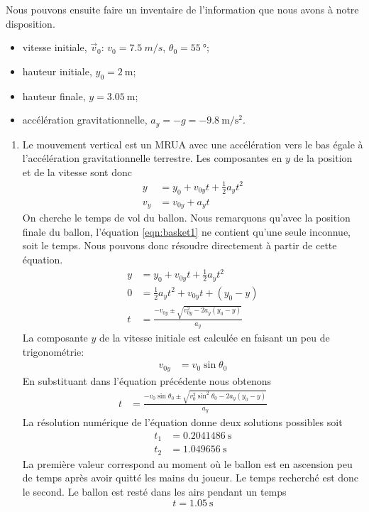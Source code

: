 \documentclass{tufte-handout}
\begin{document}
Nous pouvons ensuite faire un inventaire de l'information que nous avons à
notre disposition.

\begin{itemize}
  \item vitesse initiale, $\vec{v}_0$: $v_0 = \SI{7.5}{m/s}$,
    $\theta_0 = \SI{55}{\degree}$;
  \item hauteur initiale, $y_0 = \SI{2}{\meter}$;
  \item hauteur finale, $y = \SI{3.05}{\meter}$;
  \item accélération gravitationnelle, $a_y =
    -g = \SI{-9.8}{\meter\per\second\squared}$.
\end{itemize}

\begin{enumerate}
  \item
    Le mouvement vertical est un MRUA avec une accélération vers le bas égale à
    l'accélération gravitationnelle terrestre.  Les composantes en $y$ de la
    position et de la vitesse sont donc
    \begin{align}
      y   &= y_0 + v_{0y}t + \frac{1}{2} a_y t^2 \label{eqn:basket1}\\
      v_y &= v_{0y} + a_y t \label{eqn:basket2}
    \end{align}
    On cherche le temps de vol du ballon.  Nous remarquons qu'avec la position
    finale du ballon, l'équation \ref{eqn:basket1} ne contient qu'une seule
    inconnue, soit le temps.  Nous pouvons donc résoudre directement à partir
    de cette équation.
    \begin{align*}
      y &= y_0 + v_{0y} t + \frac{1}{2} a_y t^2 \\
      0 &= \frac{1}{2} a_y t^2 + v_{0y} t + (y_0 - y) \\
      t &= \frac{-v_{0y} \pm \sqrt{v_{0y}^2 - 2a_y(y_0 - y)}}{a_y}
    \end{align*}
    La composante $y$ de la vitesse initiale est calculée en faisant un peu de
    trigonométrie:
    \begin{align*}
      v_{0y} &= v_0 \sin \theta_0
    \end{align*}
    En substituant dans l'équation précédente nous obtenons
    \begin{align*}
      t &= \frac{-v_{0}\sin\theta_0 \pm \sqrt{v_{0}^2\sin^2\theta_0 - 2a_y(y_0 - y)}}{a_y}
    \end{align*}
    La résolution numérique de l'équation donne deux solutions possibles soit
    \begin{align*}
      t_1 &= \SI{0.2041486}{\second} \\
      t_2 &= \SI{1.049656}{\second}
    \end{align*}
    La première valeur correspond au moment où le ballon est en ascension peu
    de temps après avoir quitté les mains du joueur.  Le temps recherché est
    donc le second.  Le ballon est resté dans les airs pendant un temps
    \[
      \boxed{t = \SI{1.05}{\second}}
    \]



\end{enumerate}
\end{document}
